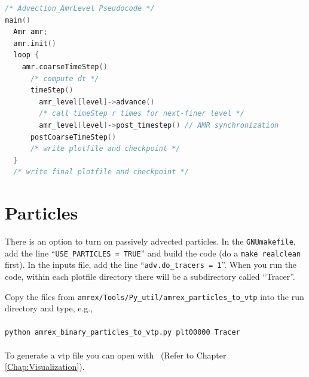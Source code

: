 \begin{lstlisting}[language=cpp]
/* Advection_AmrLevel Pseudocode */
main()
  Amr amr;
  amr.init()
  loop { 
    amr.coarseTimeStep()
      /* compute dt */
      timeStep()
        amr_level[level]->advance()
        /* call timeStep r times for next-finer level */
        amr_level[level]->post_timestep() // AMR synchronization
      postCoarseTimeStep()
      /* write plotfile and checkpoint */
  }
  /* write final plotfile and checkpoint */
\end{lstlisting}


\section{Particles}
There is an option to turn on passively advected particles.  In the {\tt GNUmakefile},
add the line ``{\tt USE\_PARTICLES = TRUE}'' and build the code 
(do a {\tt make realclean} first).
In the inputs file, add the line ``{\tt adv.do\_tracers = 1}''.
When you run the code, within each plotfile directory there will be a subdirectory
called ``Tracer''.

Copy the files from {\tt amrex/Tools/Py\_util/amrex\_particles\_to\_vtp} into
the run directory and type, e.g.,\\ \\
{\tt python amrex\_binary\_particles\_to\_vtp.py plt00000 Tracer}\\ \\
To generate a vtp file you can open with \paraview\
(Refer to Chapter \ref{Chap:Visualization}).

